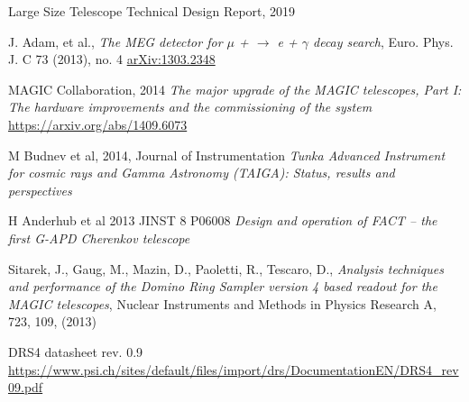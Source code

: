 \documentclass[a4paper,11pt,twoside]{article}
\begin{document}
\begin{thebibliography}{9}
Large Size Telescope Technical Design Report, 2019

J. Adam, et al.,
\textit{The MEG detector for $\mu$ + $\rightarrow$ e + $\gamma$ decay search}, Euro. Phys. J. C 73 (2013), no. 4
\url{arXiv:1303.2348}

MAGIC Collaboration, 2014
\textit{The major upgrade of the MAGIC telescopes, Part I: The hardware improvements and the commissioning of the system}
\url{https://arxiv.org/abs/1409.6073}

M Budnev et al, 2014, Journal of Instrumentation
\textit{Tunka Advanced Instrument for cosmic rays and Gamma Astronomy (TAIGA): Status, results and perspectives}

H Anderhub et al 2013 JINST 8 P06008
\textit{Design and operation of FACT – the first G-APD
Cherenkov telescope}

Sitarek, J., Gaug, M., Mazin, D., Paoletti, R., Tescaro, D., \textit{Analysis techniques and performance of the Domino Ring Sampler version 4 based readout for the MAGIC
telescopes}, Nuclear Instruments and Methods in Physics Research A, 723, 109, (2013)

DRS4 datasheet rev. 0.9
\url{https://www.psi.ch/sites/default/files/import/drs/DocumentationEN/DRS4_rev09.pdf}


\end{thebibliography}
\end{document}
